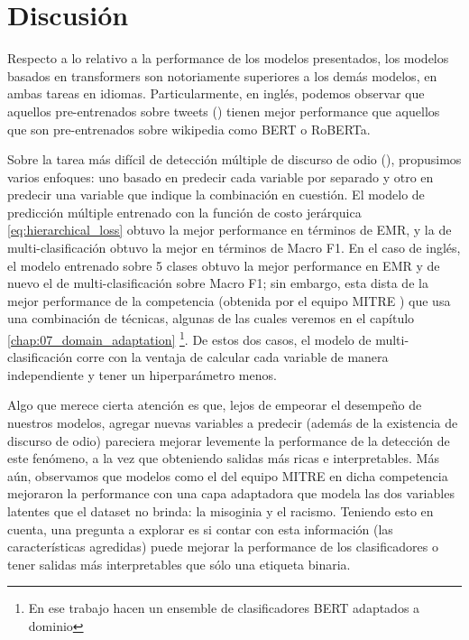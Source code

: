 \section{Discusión}

Respecto a lo relativo a la performance de los modelos presentados, los modelos basados en transformers son notoriamente superiores a los demás modelos, en ambas tareas en idiomas. Particularmente, en inglés, podemos observar que aquellos pre-entrenados sobre tweets (\bertweet{}) tienen mejor performance que aquellos que son pre-entrenados sobre wikipedia como BERT o RoBERTa.

Sobre la tarea más difícil de detección múltiple de discurso de odio (\subtaskb{}), propusimos varios enfoques: uno basado en predecir cada variable por separado y otro en predecir una variable que indique la combinación en cuestión. El modelo de predicción múltiple entrenado con la función de costo jerárquica \ref{eq:hierarchical_loss} obtuvo la mejor performance en términos de EMR, y la de multi-clasificación obtuvo la mejor en términos de Macro F1. En el caso de inglés, el modelo entrenado sobre 5 clases obtuvo la mejor performance en EMR y de nuevo el de multi-clasificación sobre Macro F1; sin embargo, esta dista de la mejor performance de la competencia (obtenida por el equipo MITRE \cite{gertner-etal-2019-mitre}) que usa una combinación de técnicas, algunas de las cuales veremos en el capítulo \ref{chap:07_domain_adaptation} \footnote{En ese trabajo hacen un ensemble de clasificadores BERT adaptados a dominio}. De estos dos casos, el modelo de multi-clasificación corre con la ventaja de calcular cada variable de manera independiente y tener un hiperparámetro menos.

Algo que merece cierta atención es que, lejos de empeorar el desempeño de nuestros modelos, agregar nuevas variables a predecir (además de la existencia de discurso de odio) pareciera mejorar levemente la performance de la detección de este fenómeno, a la vez que obteniendo salidas más ricas e interpretables. Más aún, observamos que modelos como el del equipo MITRE \citet{gertner-etal-2019-mitre} en dicha competencia mejoraron la performance con una capa adaptadora que modela las dos variables latentes que el dataset no brinda: la misoginia y el racismo. Teniendo esto en cuenta, una pregunta a explorar es si contar con esta información (las características agredidas) puede mejorar la performance de los clasificadores o tener salidas más interpretables que sólo una etiqueta binaria.

